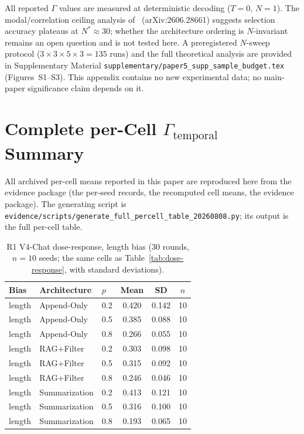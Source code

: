 \documentclass[11pt]{article}
\begin{document}
All reported $\Gamma$ values are measured at deterministic decoding ($T{=}0$, $N{=}1$). The modal/correlation ceiling analysis of~\cite{bay2026sampling} (arXiv:2606.28661) suggests selection accuracy plateaus at $N^*{\approx}30$; whether the architecture ordering is $N$-invariant remains an open question and is not tested here. A preregistered $N$-sweep protocol ($3{\times}3{\times}5{\times}3{=}135$ runs) and the full theoretical analysis are provided in Supplementary Material \texttt{supplementary/paper5\_supp\_sample\_budget.tex} (Figures~S1--S3). This appendix contains no new experimental data; no main-paper significance claim depends on it.





\section{Complete per-Cell $\Gamma_{\text{temporal}}$ Summary}
\label{sec:supp-full-percell}
All archived per-cell means reported in this paper are reproduced here from the evidence package (the per-seed records, the recomputed cell means, the evidence package). The generating script is \texttt{evidence/scripts/generate\_full\_percell\_table\_20260808.py}; its output is the full per-cell table.

\begin{table}[htbp]
\centering
\caption{R1 V4-Chat dose-response, length bias (30 rounds, $n{=}10$ seeds; the same cells as Table~\ref{tab:dose-response}, with standard deviations).}
\label{tab:supp-full-r1}
\small
\begin{tabular}{lllccc}
\toprule
Bias & Architecture & $p$ & Mean & SD & $n$ \\
\midrule
length & Append-Only & 0.2 & 0.420 & 0.142 & 10 \\
length & Append-Only & 0.5 & 0.385 & 0.088 & 10 \\
length & Append-Only & 0.8 & 0.266 & 0.055 & 10 \\
length & RAG+Filter & 0.2 & 0.303 & 0.098 & 10 \\
length & RAG+Filter & 0.5 & 0.315 & 0.092 & 10 \\
length & RAG+Filter & 0.8 & 0.246 & 0.046 & 10 \\
length & Summarization & 0.2 & 0.413 & 0.121 & 10 \\
length & Summarization & 0.5 & 0.316 & 0.100 & 10 \\
length & Summarization & 0.8 & 0.193 & 0.065 & 10 \\
\bottomrule
\end{tabular}
\end{table}
\end{document}

